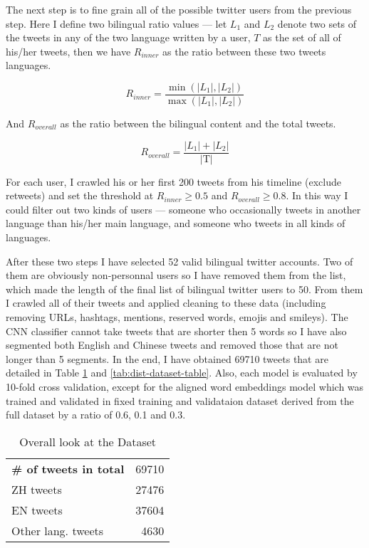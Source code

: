 \documentclass[11pt,a4paper]{article}
\begin{document}
The next step is to fine grain all of the possible twitter users from the previous step. Here I define two bilingual ratio values --- let $L_1$ and $L_2$ denote two sets of the tweets in any of the two language written by a user, $T$ as the set of all of his/her tweets, then we have $R_{inner}$ as the ratio between these two tweets languages.

\begin{equation}
  R_{inner} = \frac{\min(|L_1|, |L_2|)}{\max(|L_1|, |L_2|)}
\end{equation}

And $R_{overall}$ as the ratio between the bilingual content and the total tweets.

\begin{equation}
  R_{overall} = \frac{|L_1|+|L_2|}{\text{|T|}}
\end{equation}

For each user, I crawled his or her first 200 tweets from his timeline (exclude retweets) and set the threshold at $R_{inner} \ge 0.5$ and $R_{overall} \ge 0.8$. In this way I could filter out two kinds of users --- someone who occasionally tweets in another language than his/her main language, and someone who tweets in all kinds of languages.

After these two steps I have selected 52 valid bilingual twitter accounts. Two of them are obviously non-personnal users so I have removed them from the list, which made the length of the final list of bilingual twitter users to 50. From them I crawled all of their tweets and applied cleaning to these data (including removing URLs, hashtags, mentions, reserved words, emojis and smileys). The CNN classifier cannot take tweets that are shorter then 5 words so I have also segmented both English and Chinese tweets and removed those that are not longer than 5 segments. In the end, I have obtained 69710 tweets that are detailed in Table \ref{tab:overlook-dataset-table} and \ref{tab:dist-dataset-table}. Also, each model is evaluated by 10-fold cross validation, except for the aligned word embeddings model which was trained and validated in fixed training and validataion dataset derived from the full dataset by a ratio of 0.6, 0.1 and 0.3.

\begin{table}[t]
  \begin{center}
  \begin{tabular}{|l|r|}
  \hline \bf \# of tweets in total & 69710 \\
  \hspace{0.5cm} ZH tweets & 27476 \\
  \hspace{0.5cm} EN tweets & 37604 \\
  \hspace{0.5cm} Other lang. tweets & 4630 \\
  \hline
  \end{tabular}
  \end{center}
  \caption{\label{tab:overlook-dataset-table} Overall look at the Dataset}
\end{table}
\end{document}
